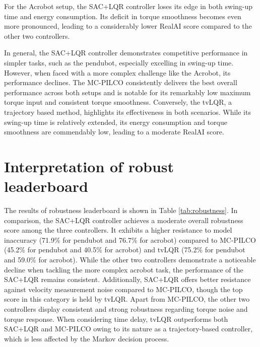 For the Acrobot setup, the SAC+LQR controller loses its edge in both swing-up time and energy consumption. Its deficit in torque smoothness becomes even more pronounced, leading to a considerably lower RealAI score compared to the other two controllers.

In general, the SAC+LQR controller demonstrates competitive performance in simpler tasks, such as the pendubot, especially excelling in swing-up time. However, when faced with a more complex challenge like the Acrobot, its performance declines. The MC-PILCO consistently delivers the best overall performance across both setups and is notable for its remarkably low maximum torque input and consistent torque smoothness. Conversely, the tvLQR, a trajectory based method, highlights its effectiveness in both scenarios. While its swing-up time is relatively extended, its energy consumption and torque smoothness are commendably low, leading to a moderate RealAI score.

\section{Interpretation of robust leaderboard}
The results of robustness leaderboard is shown in Table \ref{tab:robustness}. In comparison, the SAC+LQR controller achieves a moderate overall robustness score among the three controllers. It exhibits a higher resistance to model inaccuracy (71.9\% for pendubot and 76.7\% for acrobot) compared to MC-PILCO (45.2\% for pendubot and 40.5\% for acrobot) and tvLQR (75.2\% for pendubot and 59.0\% for acrobot). While the other two controllers demonstrate a noticeable decline when tackling the more complex acrobot task, the performance of the SAC+LQR remains consistent. Additionally, SAC+LQR offers better resistance against velocity measurement noise compared to MC-PILCO, though the top score in this category is held by tvLQR. Apart from MC-PILCO, the other two controllers display consistent and strong robustness regarding torque noise and torque response. When considering time delay, tvLQR outperforms both SAC+LQR and MC-PILCO owing to its nature as a trajectory-based controller, which is less affected by the Markov decision process.

